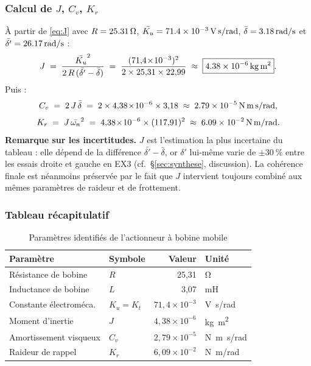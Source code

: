 \subsubsection{Calcul de \texorpdfstring{\(J\)}{J}, \texorpdfstring{\(C_v\)}{Cv}, \texorpdfstring{\(K_r\)}{Kr}}

À partir de \eqref{eq:J} avec \(R = \SI{25{,}31}{\ohm}\), \(\bar{K_u} = \SI{71{,}4e-3}{V.s/rad}\), \(\bar{\delta} = \SI{3{,}18}{rad/s}\) et \(\bar{\delta'} = \SI{26{,}17}{rad/s}\) :
\[
J \;=\; \frac{\bar{K_u}^2}{2\,R\,(\bar{\delta'} - \bar{\delta})}
\;=\; \frac{(71{,}4\!\times\!10^{-3})^2}{2 \times 25{,}31 \times 22{,}99}
\;\approx\; \boxed{\SI{4{,}38e-6}{kg.m^2}}.
\]
Puis :
\[
C_v \;=\; 2\,J\,\bar{\delta} \;=\; 2 \times 4{,}38\!\times\!10^{-6} \times 3{,}18 \;\approx\; \SI{2{,}79e-5}{N.m.s/rad},
\]
\[
K_r \;=\; J\,\bar{\omega_n}^2 \;=\; 4{,}38\!\times\!10^{-6} \times (117{,}91)^2 \;\approx\; \SI{6{,}09e-2}{N.m/rad}.
\]
\noindent\textbf{Remarque sur les incertitudes.} \(J\) est l'estimation la plus incertaine du tableau : elle dépend de la différence \(\bar{\delta'} - \bar{\delta}\), or \(\delta'\) lui-même varie de \(\pm\SI{30}{\%}\) entre les essais droite et gauche en EX3 (cf.\ §\ref{sec:synthese}, discussion). La cohérence finale est néanmoins préservée par le fait que \(J\) intervient toujours combiné aux mêmes paramètres de raideur et de frottement.

\subsubsection{Tableau récapitulatif}

\begin{table}[H]
\centering
\caption{Paramètres identifiés de l'actionneur à bobine mobile}
\begin{tabular}{llrl}
\toprule
Paramètre & Symbole & Valeur & Unité\\
\midrule
Résistance de bobine     & \(R\)         & 25{,}31              & \si{\ohm}       \\
Inductance de bobine     & \(L\)         & 3{,}07               & \si{mH}          \\
Constante électroméca.   & \(K_u = K_t\) & \(71{,}4\!\times\!10^{-3}\) & \si{V.s/rad} \\
Moment d'inertie         & \(J\)         & \(4{,}38\!\times\!10^{-6}\) & \si{kg.m^2}\\
Amortissement visqueux   & \(C_v\)       & \(2{,}79\!\times\!10^{-5}\) & \si{N.m.s/rad}\\
Raideur de rappel        & \(K_r\)       & \(6{,}09\!\times\!10^{-2}\) & \si{N.m/rad} \\
\bottomrule
\end{tabular}
\label{tab:synthese}
\end{table}

